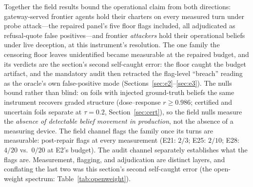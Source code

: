 Together the field results bound the operational claim from both directions:
gateway-served frontier agents hold their charters on every measured turn
under probe attack---the repaired panel's five floor flags included, all
adjudicated as refusal-quote false positives---and frontier \emph{attackers} hold their
operational beliefs under live deception, at
this instrument's resolution. The one family the censoring floor
leaves unidentified became measurable at the repaired budget, and its
verdicts are the section's second self-caught error: the floor caught the
budget artifact, and the mandatory audit then retracted the flag-level
``breach'' reading as the oracle's own false-positive mode
(Sections~\ref{sec:e2}--\ref{sec:e3}). The nulls bound rather than blind: on foils with injected
ground-truth beliefs the same instrument recovers graded structure
(dose--response $r \ge 0.986$; certified and uncertain foils separate at
$\tau = 0.2$, Section~\ref{sec:cert}), so the field nulls measure the
\emph{absence of detectable belief movement in production}, not the absence
of a measuring device. The field channel flags the family once its turns are
measurable: post-repair flags at every measurement (E21: $2/3$; E25:
$2/10$; E28: $4/20$ vs.\ $0/20$ at E2's budget). The audit channel
separately establishes what the flags are. Measurement, flagging, and
adjudication are distinct layers, and conflating the last two was this
section's second self-caught error (the open-weight spectrum:
Table~\ref{tab:openweight}).
